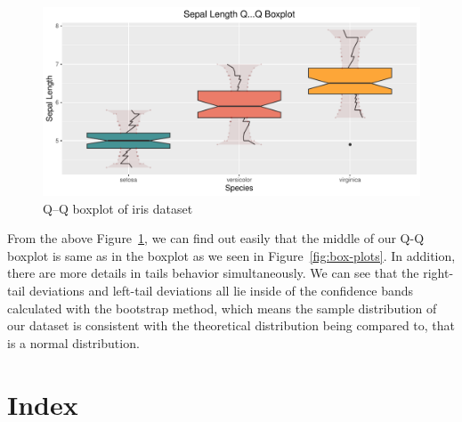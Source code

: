 \documentclass{article}\usepackage[]{graphicx}\usepackage[]{xcolor}
\makeatletter
\def\maxwidth{ %
  \ifdim\Gin@nat@width>\linewidth
    \linewidth
  \else
    \Gin@nat@width
  \fi
}
\newenvironment{knitrout}{}{} %
\numberwithin{equation}{section}
\makeatother
\begin{document}
\begin{knitrout}\scriptsize
{}\color{fgcolor}\begin{figure}[h]

{\centering \includegraphics[width=\maxwidth]{figure/beamer-QQboxplots-1} 

}

\caption[Q–Q boxplot of iris dataset]{Q–Q boxplot of iris dataset}\label{fig:QQboxplots}
\end{figure}

\end{knitrout}

\noindent
From the above Figure~\ref{fig:QQboxplots}, we can find out easily that the middle of our Q-Q boxplot is same as in the boxplot as we seen in Figure~\ref{fig:box-plots}. In addition, there are more details in tails behavior simultaneously. We can see that the right-tail deviations and left-tail deviations all lie inside of the confidence bands calculated with the bootstrap method, which means the sample distribution of our dataset is consistent with the theoretical distribution being compared to, that is a normal distribution.
\noindent



\newpage  

\section{Index}  
\end{document}
